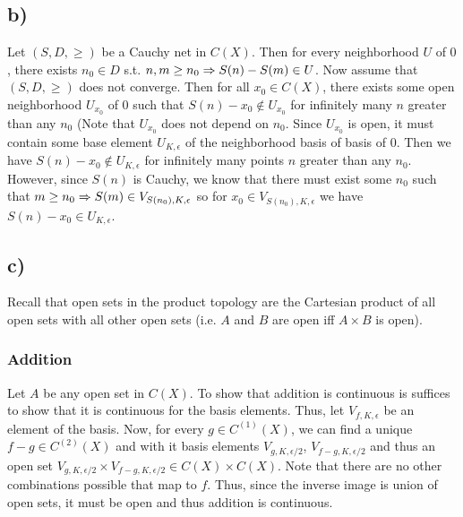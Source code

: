 \subsection*{b)}
Let $(S,D,\geq)$ be a Cauchy net in $C(X)$. Then for every neighborhood $U$ of $0$, there exists $n_0\in D$ s.t. $n,m \geq  n_0 \Rightarrow S(n)-S(m)\in U$. Now assume that $(S,D,\geq)$ does not converge. Then for all $x_0\in C(X)$, there exists some open neighborhood $U_{x_0}$ of $0$ such that $S(n)-x_0 \notin U_{x_0}$ for infinitely many $n$ greater than any $n_0$ (Note that $U_{x_0}$ does not depend on $n_0$. Since $U_{x_0}$ is open, it must contain some base element $U_{K,\epsilon}$ of the neighborhood basis of basis of $0$. Then we have $S(n)-x_0\notin U_{K,\epsilon}$ for infinitely many points $n$ greater than any $n_0$. However, since $S(n)$ is Cauchy, we know that there must exist some $n_0$ such that $m\geq n_0 \Rightarrow S(m) \in V_{S(n_0),K,\epsilon}$ so for $x_0\in V_{S(n_0),K,\epsilon}$ we have $S(n)-x_0\in U_{K,\epsilon}$. 
\subsection*{c)}
Recall that open sets in the product topology are the Cartesian product of all open sets with all other open sets (i.e. $A$ and $B$ are open iff $A\times B$ is open). 
\subsubsection*{Addition}
Let $A$ be any open set in $C(X)$. To show that addition is continuous is suffices to show that it is continuous for the basis elements. Thus, let $V_{f,K,\epsilon}$ be an element of the basis.  Now, for every $g\in C^(1)(X)$, we can find a unique $f-g\in C^(2)(X)$ and with it  basis elements $V_{g,K,\epsilon/2}$, $V_{f-g,K,\epsilon/2}$ and thus an open set $V_{g,K,\epsilon/2}\times V_{f-g,K,\epsilon/2}\in C(X)\times C(X)$. Note that there are no other combinations possible that map to $f$. Thus, since the inverse image is union of open sets, it must be open and thus addition is continuous. 
